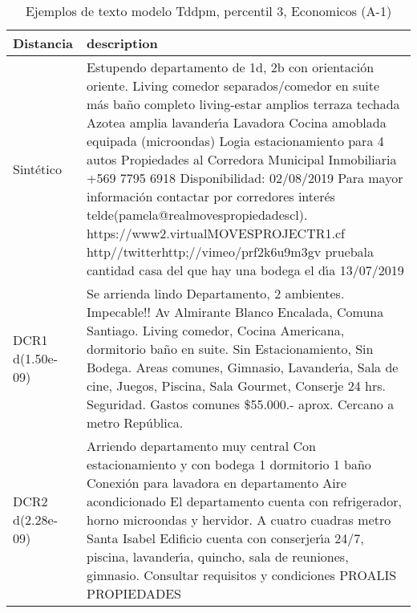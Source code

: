 \begin{table}[H]
\centering
\fontsize{10}{14}\selectfont
\caption{Ejemplos de texto modelo Tddpm, percentil 3, Economicos (A-1)}
\label{table-example-economicos-a-1-tddpm_mlp-3p-text}
\begin{tabular}{|l|m{35em}|}
\hline
\rowcolor[gray]{0.8}
Distancia & description \\
\hline Sintético & Estupendo departamento de 1d, 2b con orientaci\'on oriente. Living comedor separados/comedor en suite m\'as ba\~no completo living-estar amplios terraza techada Azotea amplia lavander{\'\i}a Lavadora Cocina amoblada equipada (microondas) Logia estacionamiento para 4 autos Propiedades al Corredora Municipal Inmobiliaria +569 7795 6918 Disponibilidad: 02/08/2019 Para mayor informaci\'on contactar por corredores inter\'es telde(pamela@realmovespropiedadescl). https://www2.virtualMOVESPROJECTR1.cf http//twitterhttp;//vimeo/prf2k6u9m3gv pruebala cantidad casa del que hay una bodega el d{\'\i}a 13/07/2019 \\
\hline DCR1 d(1.50e-09) & Se arrienda lindo Departamento, 2 ambientes. Impecable!! Av Almirante Blanco Encalada, Comuna Santiago. Living comedor, Cocina Americana, dormitorio ba\~no en suite. Sin Estacionamiento, Sin Bodega. Areas comunes, Gimnasio, Lavander{\'\i}a, Sala de cine, Juegos, Piscina, Sala Gourmet, Conserje 24 hrs. Seguridad. Gastos comunes \$55.000.- aprox. Cercano a metro Rep\'ublica. \\
\hline DCR2 d(2.28e-09) & Arriendo departamento muy central Con estacionamiento y con bodega 1 dormitorio 1 ba\~no Conexi\'on para lavadora en departamento Aire acondicionado El departamento cuenta con refrigerador, horno microondas y hervidor. A cuatro cuadras metro Santa Isabel Edificio cuenta con conserjer{\'\i}a 24/7, piscina, lavander{\'\i}a, quincho, sala de reuniones, gimnasio.  Consultar requisitos y condiciones  PROALIS PROPIEDADES \\
\hline
\end{tabular}
\end{table}
